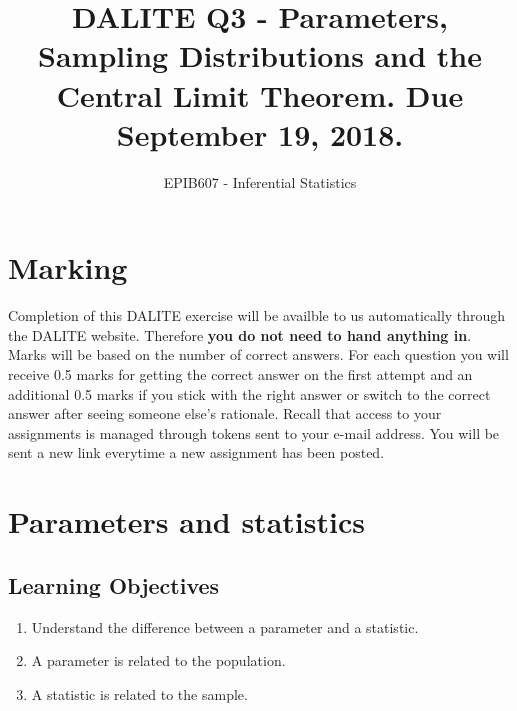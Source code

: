 \documentclass[letterpaper,9pt,twocolumn,twoside,printwatermark=false]{pinp}
\title{DALITE Q3 - Parameters, Sampling Distributions and the Central Limit
Theorem. Due September 19, 2018.}
\author[a]{EPIB607 - Inferential Statistics}
\affil[a]{Fall 2018, McGill University}
\providecommand{\tightlist}{%
  \setlength{\itemsep}{0pt}\setlength{\parskip}{0pt}}
\begin{document}
\verticaladjustment{-2pt}

\maketitle
\thispagestyle{firststyle}



\section*{Marking}\label{marking}

Completion of this DALITE exercise will be availble to us automatically
through the DALITE website. Therefore \textbf{you do not need to hand
anything in}. Marks will be based on the number of correct answers. For
each question you will receive 0.5 marks for getting the correct answer
on the first attempt and an additional 0.5 marks if you stick with the
right answer or switch to the correct answer after seeing someone else's
rationale. Recall that access to your assignments is managed through
tokens sent to your e-mail address. You will be sent a new link
everytime a new assignment has been posted.

\section{Parameters and statistics}\label{parameters-and-statistics}

\subsection{Learning Objectives}\label{learning-objectives}

\begin{enumerate}
\def\labelenumi{\arabic{enumi}.}
\tightlist
\item
  Understand the difference between a parameter and a statistic.
\item
  A parameter is related to the population.
\item
  A statistic is related to the sample.
\end{enumerate}
\end{document}
